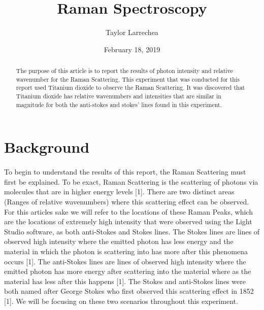 \documentclass[]{article}
\title{\textbf{Raman Spectroscopy}}
\author{Taylor Larrechea}
\affil{Colorado Mesa University}
\affil{Department of Physical and Environmental Sciences}
\date{February 18, 2019}
\begin{document}
\maketitle
\begin{abstract}
\paragraph{}
\setlength{\parskip}{1em}
The purpose of this article is to report the results of photon intensity and relative wavenumber for the Raman Scattering. This experiment that was conducted for this report used Titanium dioxide to observe the Raman Scattering. It was discovered that Titanium dioxide has relative wavenumbers and intensities that are similar in magnitude for both the anti-stokes and stokes' lines found in this experiment.
\end{abstract}
\section{Background}
\begin{multicols}{2}
\paragraph{}
\setlength{\parskip}{1em}
To begin to understand the results of this report, the Raman Scattering must first be explained. To be exact, Raman Scattering is the scattering of photons via molecules that are in higher energy levels [1]. There are two distinct areas (Ranges of relative wavenumbers) where this scattering effect can be observed. For this articles sake we will refer to the locations of these Raman Peaks, which are the locations of extremely high intensity that were observed using the Light Studio software, as both anti-Stokes and Stokes lines. The Stokes lines are lines of observed high intensity where the emitted photon has less energy and the material in which the photon is scattering into has more after this phenomena occurs [1]. The anti-Stokes lines are lines of observed high intensity where the emitted photon has more energy after scattering into the material where as the material has less after this happens [1]. The Stokes and anti-Stokes lines were both named after George Stokes who first observed this scattering effect in 1852 [1]. We will be focusing on these two scenarios throughout this experiment.
\end{multicols}
\end{document}
